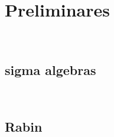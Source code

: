 \chapter{Preliminares}
~\label{cap:pre}

\section{sigma algebras}
~\label{cap:pre:sec:algebra}

\section{Rabin}

